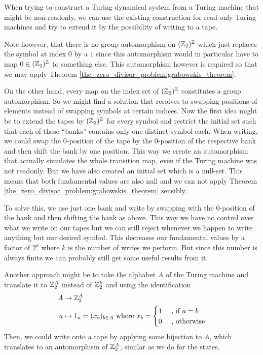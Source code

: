 \begin{Remark}
	\label{remarks:tds_construction}
	When trying to construct a Turing dynamical system from a Turing machine that might be non-readonly, we can use the existing construction for read-only Turing machines and try to extend it by the possibility of writing to a tape.

	Note however, that there is no group automorphism on $(\mathbb{Z}_2)^{\mathbb{Z}}$ which just replaces the symbol at index $0$ by a $1$ since this automorphism would in particular have to map $0 \in (\mathbb{Z}_2)^{\mathbb{Z}}$ to something else.
	This automorphism however is required so that we may apply Theorem \ref{the_zero_divisor_problem:grabowskis_theorem}.

	On the other hand, every map on the index set of $(\mathbb{Z}_2)^{\mathbb{Z}}$ constitutes a group automorphism. So we might find a solution that resolves to swapping positions of elements instead of swapping symbols at certain indices.
	Now the first idea might be to extend the tapes by $(\mathbb{Z}_2)^{\mathbb{Z}}$ for every symbol and restrict the initial set such that each of these ``banks'' contains only one distinct symbol each.
	When writing, we could swap the $0$-position of the tape by the $0$-position of the respective bank and then shift the bank by one position.
	This way we create an automorphism that actually simulates the whole transition map, even if the Turing machine was not readonly.
	But we have also created an initial set which is a null-set. This means that both fundamental values are also null and we can not apply Theorem \ref{the_zero_divisor_problem:grabowskis_theorem} sensibly.

	To solve this, we use just one bank and write by swapping with the $0$-position of the bank and then shifting the bank as above.
	This way we have no control over what we write on our tapes but we can still reject whenever we happen to write anything but our desired symbol. This decreases our fundamental values by a factor of $2^k$ where $k$ is the number of writes we perform. But since this number is always finite we can probably still get some useful results from it.

	Another approach might be to take the alphabet $A$ of the Turing machine and translate it to $\mathbb{Z}_2^A$ instead of $\mathbb{Z}_2^k$ and using the identification
	\begin{align*}
		A &\to \mathbb{Z}_2^A \\
		a &\mapsto 1_a = (x_b)_{b \in A} ~\text{where}~ x_b = \begin{cases} 1 &~\text{, if}~ a = b \\ 0 &~\text{, otherwise} \end{cases}
	\end{align*}
	Then, we could write onto a tape by applying some bijection to $A$, which translates to an automorphism of $\mathbb{Z}_2^A$, similar as we do for the states.


\end{Remark}
